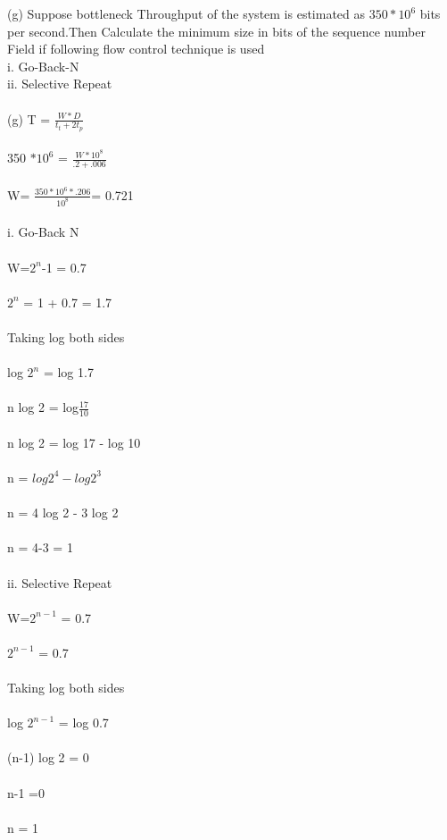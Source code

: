 \documentclass[a4paper,12pt]{article}
\begin{document}
(g) Suppose bottleneck Throughput of the system is estimated as $350 * 10^6$ bits per
second.Then Calculate the minimum size in bits of the sequence number Field if
following
flow control technique is used\\
i. Go-Back-N\\
ii. Selective Repeat\\\\
(g) T = $\frac{W*D}{t_{t}+2t_{p}}$\\\\
   350 $* 10^6$    = $\frac{W*10^8}{.2+.006}$ \\\\
   W= $\frac{350* 10^6 * .206}{10^8}$= 0.721\\\\
   i. Go-Back N\\\\
   W=$2^{n}$-1 = 0.7\\\\
   $2^{n}$ = 1 + 0.7 = 1.7\\\\
   Taking log both sides \\\\
   log $2^{n}$ = log 1.7\\\\
   n log 2 = log$\frac{17}{10}$\\\\
   n log 2 = log 17 - log 10 \\\\
   n = $log 2^{4} - log 2^{3}$\\\\
   n = 4 log 2 - 3 log 2 \\\\
   n = 4-3 = 1 \\\\

   ii. Selective Repeat \\\\
   W=$2^{n-1}$ = 0.7\\\\
   $2^{n-1}$ = 0.7 \\\\
   Taking log both sides \\\\
   log $2^{n-1}$ = log 0.7\\\\
   (n-1) log 2 = 0\\\\
   n-1 =0\\\\
   n = 1 \\\\
\end{document}
